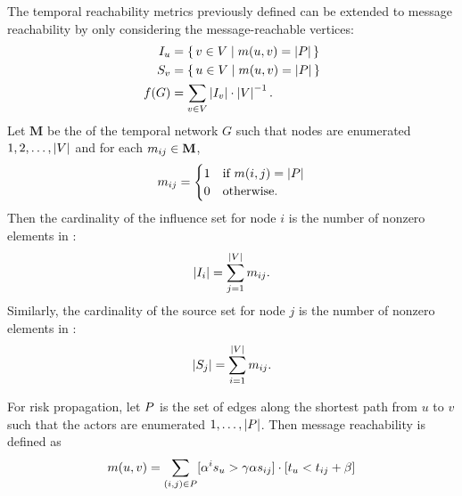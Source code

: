 The temporal reachability metrics previously defined can be extended to message reachability by only considering the message-reachable vertices:
\begin{align*}
  I_u &= \set{ v \in V| m(u, v) = \left\vert P\right\vert} \\
  S_v &= \set{ u \in V| m(u, v) = \left\vert P\right\vert} \\
  f(G) &= \sum_{v \in V} \left\vert I_v \right\vert \cdot \left\vert V \right\vert^{-1}.
\end{align*}
Let $\mathbf{M}$ be the  of the temporal network $G$ such that nodes are enumerated $1, 2, \ldots, \left\vert V \right\vert$ and for each $m_{ij} \in \mathbf{M}$,
\begin{equation*}
  m_{ij} = 
    \begin{cases}
      1 & \text{if } m(i, j) = \left\vert P \right\vert \\
      0 & \text{otherwise.}
    \end{cases}
\end{equation*}
Then the cardinality of the influence set for node $i$ is the number of nonzero elements in :
\begin{equation}\label{eq:influence-size}
  \left\vert I_i \right\vert = \sum_{j=1}^{\left\vert V \right\vert} m_{ij} .
\end{equation}
Similarly, the cardinality of the source set for node $j$ is the number of nonzero elements in :
\begin{equation}\label{eq:source-size}
  \left\vert S_j \right\vert = \sum_{i=1}^{\left\vert V \right\vert} m_{ij} .
\end{equation}

For risk propagation, let $P$ is the set of edges along the shortest path from $u$ to $v$ such that the actors are enumerated $1, \ldots, \left\vert P \right\vert$. Then message reachability is defined as
\begin{equation}\label{eq:reach}
  m(u, v) = \sum_{(i, j) \in P} [\alpha^{i} s_u > \gamma \alpha s_{ij}] \cdot [t_u < t_{ij} + \beta]
\end{equation}

